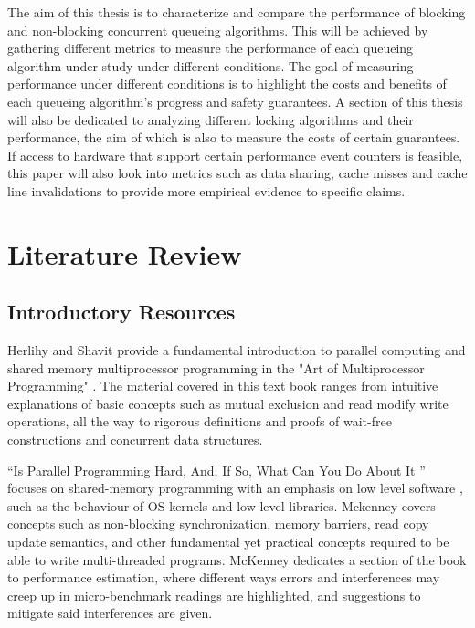 \documentclass[a4paper, 12pt, titlepage]{article}
\begin{document}
\begin{singlespace}
The aim of this thesis is to characterize and compare the performance of blocking \cite{anderson1990performance, herlihy2020art,graunke1990synchronization} and non-blocking \cite{herlihy2020art,valois1995lock} concurrent queueing algorithms. This will be achieved by gathering different metrics to measure the performance of each queueing algorithm under study under different conditions. The goal of measuring performance under different conditions is to highlight the costs and benefits of each queueing algorithm's progress and safety guarantees. A section of this thesis will also be dedicated to analyzing different locking algorithms and their performance, the aim of which is also to measure the costs of certain guarantees. If access to hardware that support certain performance event counters is feasible, this paper will also look into metrics such as data sharing, cache misses and cache line invalidations\cite{intelmanual,intelmanualoptimization,sahelices2009methodology} to provide more empirical evidence to specific claims.

\section{Literature Review}
\subsection{Introductory Resources}
Herlihy and Shavit provide a fundamental introduction to parallel computing and shared memory multiprocessor programming in the "Art of Multiprocessor Programming" \cite{herlihy2020art}. The material covered in this text book ranges from intuitive explanations of basic concepts such as mutual exclusion and read modify write operations, all the way to rigorous definitions and proofs of wait-free constructions and concurrent data structures.

``Is Parallel Programming Hard, And, If So, What Can You Do About It '' focuses on shared-memory programming with an emphasis on low level software \cite{mckenney2017parallel}, such as the behaviour of OS kernels and low-level libraries. Mckenney covers concepts such as non-blocking synchronization, memory barriers, read copy update semantics, and other fundamental yet practical concepts required to be able to write multi-threaded programs. McKenney dedicates a section of the book to performance estimation, where different ways errors and interferences may creep up in micro-benchmark readings are highlighted, and suggestions to mitigate said interferences are given.

\end{singlespace}
\end{document}
